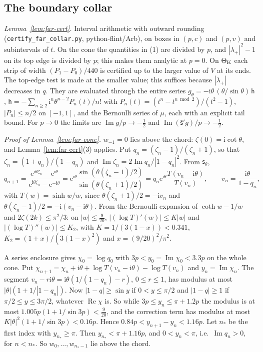 \documentclass[11pt]{amsart}
\theoremstyle{definition}
\newcommand{\eee}{\mathrm{e}}
\newcommand{\ii}{\mathrm{i}}
\begin{document}
\subsection{The boundary collar}\label{app:collar}
\emph{Lemma~\ref{lem:far-cert}.}  Interval arithmetic with outward rounding (\texttt{certify\_far\_collar.py},
python-flint/Arb), on boxes in $(p,c)$ and $(p,v)$ and subintervals of $t$.
On the cone the quantities in (1) are divided by $p$, and
$|\lambda_+|^2-1$ on its top edge is divided by $p$; this makes them analytic at $p=0$.
On $\Theta_{\rm K}$ each strip of width $(P_1-P_0)/440$ is certified up to the larger
value of $V$ at its ends.  The top-edge test is made at the smaller value;
this suffices because $|\lambda_+|$ decreases in $q$.  They are evaluated through the entire series
$g_\theta=-\ii\theta\,(\theta/\sin\theta)\,\mathsf h$,
$\mathsf h=-\sum_{n\ge2}\ii^n\theta^{n-2}P_n(t)/n!$ with $P_n(t)=(t^n-t^{n\bmod2})/(t^2-1)$,
$|P_n|\le n/2$ on $[-1,1]$, and the Bernoulli series of $\mu$, each with an explicit tail
bound.  For $p\to0$ the limits are $\operatorname{Im}g/p\to-\tfrac12$ and
$\operatorname{Im}(\bar{\mathsf s}'g)/p\to-\tfrac12$.

\emph{Proof of Lemma~\ref{lem:far-cone}.}  $w_{-1}=0$ lies above the chord: $\zeta(0)=\ii\cot\theta$, and Lemma~\ref{lem:far-cert}(3) applies.  Put
$q_n=(\zeta_n-1)/(\zeta_n+1)$, so that $\zeta_n=(1+q_n)/(1-q_n)$ and $\operatorname{Im}\zeta_n=2\operatorname{Im}q_n/|1-q_n|^2$.
From $\mathsf s_\theta$,
\[
 q_{n+1}=\frac{\eee^{\ii\theta\zeta_n}-\eee^{\ii\theta}}{\eee^{\ii\theta\zeta_n}-\eee^{-\ii\theta}}
 =\eee^{\ii\theta}\frac{\sin(\theta(\zeta_n-1)/2)}{\sin(\theta(\zeta_n+1)/2)}
 =q_n\eee^{\ii\theta}\frac{T(v_n-\ii\theta)}{T(v_n)},\qquad v_n=\frac{\ii\theta}{1-q_n},
\]
with $T(w)=\sinh w/w$, since $\theta(\zeta_n+1)/2=-\ii v_n$ and $\theta(\zeta_n-1)/2=-\ii(v_n-\ii\theta)$.
From the Bernoulli expansion of $\coth w-1/w$ and $2\zeta(2k)\le\pi^2/3$: on $|w|\le\tfrac{9}{20}$,
$|(\log T)'(w)|\le K|w|$ and $|(\log T)''(w)|\le K_2$, with $K=1/(3(1-x))<0.341$,
$K_2=(1+x)/(3(1-x)^2)$ and $x=(9/20)^2/\pi^2$.

A series enclosure gives $\chi_0=\log q_0$ with $3p<y_0=\operatorname{Im}\chi_0<3.3p$ on the whole cone.
Put $\chi_{n+1}=\chi_n+\ii\theta+\log T(v_n-\ii\theta)-\log T(v_n)$ and $y_n=\operatorname{Im}\chi_n$.  The segment
$v_n-r\ii\theta=\ii\theta(1/(1-q_n)-r)$, $0\le r\le1$, has modulus at most $|\theta|(1+1/|1-q_n|)$.
Now $|1-q|\ge\sin y$ if $0<y\le\pi/2$ and $|1-q|\ge1$ if $\pi/2\le y\le3\pi/2$, whatever $\operatorname{Re}\chi$ is.  So
while $3p\le y_n\le\pi+1.2p$ the modulus is at most $1.005p(1+1/\sin3p)<\tfrac9{20}$, and the
correction term has modulus at most $K|\theta|^2(1+1/\sin 3p)<0.16p$.  Hence
$0.84p<y_{n+1}-y_n<1.16p$.  Let $n_*$ be the first index with $y_{n_*}\ge\pi$.  Then
$y_{n_*}<\pi+1.16p$, and $0<y_n<\pi$, i.e.\ $\operatorname{Im}q_n>0$, for $n<n_*$.  So $w_0,\dots,w_{n_*-1}$ lie
above the chord.
\end{document}
